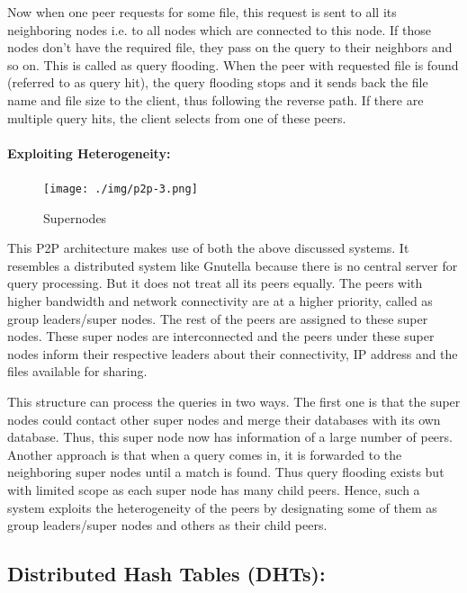 \documentclass[a4paper,12pt]{article}
\begin{document}
Now when one peer requests for some file, this request is sent to all its neighboring nodes i.e. to all nodes which are connected to this node. If those nodes don’t have the required file, they pass on the query to their neighbors and so on. This is called as query flooding. When the peer with requested file is found (referred to as query hit), the query flooding stops and it sends back the file name and file size to the client, thus following the reverse path. If there are multiple query hits, the client selects from one of these peers.

\paragraph{Exploiting Heterogeneity:}

\begin{figure}
\centering
\texttt{[image: ./img/p2p-3.png]}
\caption{\label{fig:p2p-3} Supernodes}
\end{figure}

This P2P architecture makes use of both the above discussed systems. It resembles a distributed system like Gnutella because there is no central server for query processing. But it does not treat all its peers equally. The peers with higher bandwidth and network connectivity are at a higher priority, called as group leaders/super nodes. The rest of the peers are assigned to these super nodes. These super nodes are interconnected and the peers under these super nodes inform their respective leaders about their connectivity, IP address and the files available for sharing.

This structure can process the queries in two ways. The first one is that the super nodes could contact other super nodes and merge their databases with its own database. Thus, this super node now has information of a large number of peers. Another approach is that when a query comes in, it is forwarded to the neighboring super nodes until a match is found. Thus query flooding exists but with limited scope as each super node has many child peers. Hence, such a system exploits the heterogeneity of the peers by designating some of them as group leaders/super nodes and others as their child peers.


\subsection{Distributed Hash Tables (DHTs):}
\end{document}
